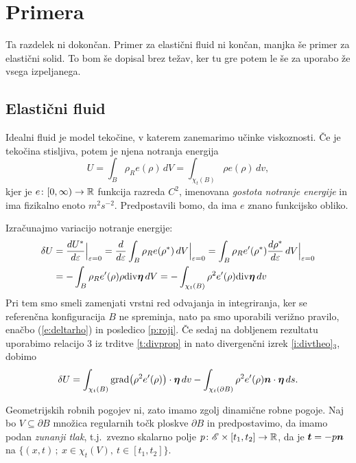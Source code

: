 \section{Primera}


\textcolor[rgb]{1,0,0}{Ta razdelek ni dokončan. Primer za elastični fluid ni končan,
manjka še primer za elastični solid. To bom še dopisal brez težav, ker tu gre
potem le še za uporabo že vsega izpeljanega.}


\subsection{Elastični fluid}


Idealni fluid je model tekočine, v katerem zanemarimo učinke viskoznosti. Če je tekočina
stisljiva, potem je njena notranja energija
\[ U=\int_{B}\rho_R e(\rho)\,dV=\int_{\chi_t(B)}\rho e(\rho)\,dv, \]
kjer je $e\colon[0,\infty)\to\mathbb R$ funkcija razreda $C^2$, imenovana
\emph{gostota notranje energije} in ima fizikalno enoto $m^2s^{-2}$.
Predpostavili bomo, da ima $e$ znano funkcijsko obliko.

Izračunajmo variacijo notranje energije:
\begin{align*} 
	\delta U &=\frac{dU^*}{d\varepsilon}\Big|_{\varepsilon=0}=\frac{d}{d\varepsilon}
	\int_{B}\rho_R e(\rho^*)\,dV \Big|_{\varepsilon=0} =
	\int_{B}\rho_R e'(\rho^*)\frac{d\rho^*}{d\varepsilon}\,dV \Big|_{\varepsilon=0} \\
	&= -\int_{B}\rho_R e'(\rho)\rho\mathrm{div}\boldsymbol \eta\,dV
	= -\int_{\chi_t(B)}\rho^2 e'(\rho)\mathrm{div}\boldsymbol \eta\,dv
\end{align*}
Pri tem smo smeli zamenjati vrstni red odvajanja in integriranja, ker se referenčna
konfiguracija $B$ ne spreminja, nato pa smo uporabili verižno pravilo, enačbo
(\ref{e:deltarho}) in posledico \ref{p:roji}.
Če sedaj na dobljenem rezultatu uporabimo relacijo 3 iz trditve \ref{t:divprop} in
nato divergenčni izrek \ref{i:divtheo}$_3$, dobimo
\begin{equation} \label{e:varpot}
	\delta U=\int_{\chi_t(B)}\mathrm{grad}\big(\rho^2 e'(\rho)\big)\cdot\boldsymbol \eta\,dv
	-\int_{\chi_t(\partial B)}\rho^2 e'(\rho)\boldsymbol n\cdot\boldsymbol \eta\,ds.
\end{equation}

Geometrijskih robnih pogojev ni, zato imamo zgolj dinamične robne pogoje.
Naj bo $V\subseteq\partial B$ množica regularnih točk ploskve $\partial B$ in
predpostavimo, da imamo podan \emph{zunanji tlak}, t.j.~zvezno skalarno polje
$p\colon \mathscr E\times[t_1,t_2]\to\mathbb R$, da je $\boldsymbol t=-p\boldsymbol n$ na
$\{(x,t)\,;\ x\in\chi_t(V),\ t\in[t_1,t_2]\}$.

